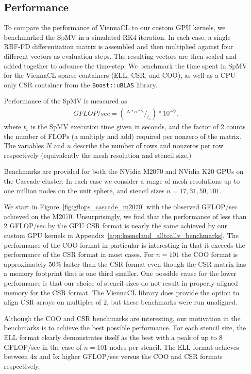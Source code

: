 \documentclass{report}
\begin{document}
\subsection{Performance}
To compare the performance of ViennaCL to our custom GPU kernels, we benchmarked the SpMV in a simulated RK4 iteration. In each case, a single RBF-FD differentiation matrix is assembled and then multiplied against four different vectors as evaluation steps. The resulting vectors are then scaled and added together to advance the time-step. We benchmark the time spent in SpMV for the ViennaCL sparse containers (ELL, CSR, and COO), as well as a CPU-only CSR container from the \texttt{Boost::uBLAS} library. 

Performance of the SpMV is measured as
\begin{align}
GFLOP/sec = (\ ^{N * n * 2} /_{t_{s}} ) * 10^{-9},
\end{align}
where $t_{s}$ is the SpMV execution time given in seconds, and the factor of 2 counts the number of FLOPs (a multiply and add) required per nonzero of the matrix. The variables $N$ and $n$ describe the number of rows and nonzeros per row respectively (equivalently the mesh resolution and stencil size.)

Benchmarks are provided for both the NVidia M2070 and NVidia K20 GPUs on the Cascade cluster. In each case we consider a range of mesh resolutions up to one million nodes on the unit sphere, and stencil sizes $n=17, 31, 50, 101$. 

We start in Figure~\ref{fig:gflops_cascade_m2070} with the observed GFLOP/sec achieved on the M2070. Unsurprisingly, we find that the performance of less than 2 GFLOP/sec by the GPU CSR format is nearly the same achieved by our custom GPU kernels in Appendix~\ref{app:keeneland_alltoallv_benchmarks}. The performance of the COO format in particular is interesting in that it exceeds the performance of the CSR format in most cases. For $n=101$ the COO format is approximately 50\% faster than the CSR format even though the CSR matrix has a memory footprint that is one third smaller. One possible cause for the lower performance is that our choice of stencil sizes do not result in properly aligned memory for the CSR format. The ViennaCL library does provide the option to align CSR arrays on multiples of 2, but these benchmarks were run unaligned. 

Although the COO and CSR benchmarks are interesting, our motivation in the benchmarks is to achieve the best possible performance. For each stencil size, the ELL format clearly demonstrates itself as the best with a peak of up to 8 GFLOP/sec in the case of $n=101$ nodes per stencil. The ELL format achieves between 4x and 5x higher GFLOP/sec versus the COO and CSR formats respectively.  
\end{document}
